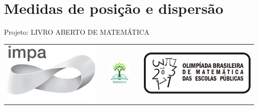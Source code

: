 \renewcommand\chapterillustration{./abertura-estatistica2}%
\renewcommand\chapterwhat{Medidas de posição: média, mediana, moda e quartis. Medidas de dispersão:
desvio médio, variância, desvio padrão, amplitude amostral, distância entre quartis e
coeficiente de variação. Construção do desenho-esquemático (boxplot).} 
\renewcommand\chapterbecause{As medidas resumo (posição e dispersão) correspondem a uma síntese do conjunto de
dados observados e ao passo preliminar para fazer uma inferência estatística, ou seja, a
partir das informações obtidas na amostra, expandir nossas conclusões para a população.
Como as distribuições podem apresentar formas variadas é importante conhecer
diferentes tipos de medidas resumo, tanto de posição como de dispersão, para usar
medidas apropriadas em cada caso.} 
\chapter{Medidas de posição e dispersão}
\label{\detokenize{PE104:medidas-de-posicao-e-dispersao}}\label{\detokenize{PE104::doc}}

\mbox{}\thispagestyle{empty}\clearpage

\thispagestyle{empty}

\begin{center}
Projeto: LIVRO ABERTO DE MATEMÁTICA

\noindent \begin{tabular}{lcccr}
\includegraphics[scale=.15]{impa}& \quad\quad& \includegraphics[width=3cm]{logo} & \quad\quad& \includegraphics[scale=.24]{obmep} 
\end{tabular}
\end{center}

